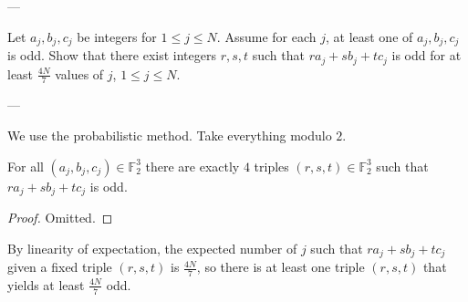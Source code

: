
---

Let $a_j,b_j,c_j$ be integers for $1\le j\le N$. Assume for each $j$, at least one of $a_j,b_j,c_j$ is odd. Show that there exist integers $r,s,t$ such that $ra_j+sb_j+tc_j$ is odd for at least $\tfrac{4N}7$ values of $j$, $1\le j\le N$.

---

We use the probabilistic method. Take everything modulo $2$.
\begin{iclaim*}
    For all $(a_j,b_j,c_j)\in\mathbb F_2^3$ there are exactly $4$ triples $(r,s,t)\in\mathbb F_2^3$ such that $ra_j+sb_j+tc_j$ is odd.
\end{iclaim*}
\begin{proof}
    Omitted.
\end{proof}

By linearity of expectation, the expected number of $j$ such that $ra_j+sb_j+tc_j$ given a fixed triple $(r,s,t)$ is $\tfrac{4N}7$, so there is at least one triple $(r,s,t)$ that yields at least $\tfrac{4N}7$ odd.
